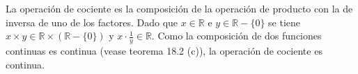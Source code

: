 \documentclass{article}
\begin{document}
La operación de cociente es la composición de la operación de producto con la de inversa de uno de los factores. Dado que $ x\in \mathbb{R}$ e $y\in \mathbb{R}-\{0\}$ se tiene $x\times y \in \mathbb{R}\times (\mathbb{R}-\{0\})$ y $x\cdot \frac{1}{y}\in \mathbb{R}$. Como la composición de dos funciones continuas es continua (vease teorema 18.2 (c)), la operación de cociente es continua.
\end{document}
